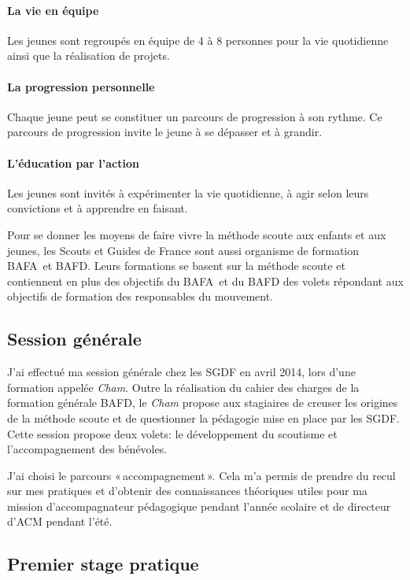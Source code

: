 \documentclass[titlepage,11pt,a4paper]{article}
\begin{document}
\paragraph{La vie en équipe} Les jeunes sont regroupés en équipe de 4 à 8 personnes pour
la vie quotidienne ainsi que la réalisation de projets.

\paragraph{La progression personnelle} Chaque jeune peut se constituer un parcours
de progression à son rythme. Ce parcours de progression invite le jeune à se dépasser et à
grandir.

\paragraph{L'éducation par l'action} Les jeunes sont invités à expérimenter la vie
quotidienne, à agir selon leurs convictions et à apprendre en faisant.

Pour se donner les moyens de faire vivre la méthode scoute aux enfants et aux jeunes, les
Scouts et Guides de France sont aussi organisme de formation BAFA et BAFD\@. Leurs
formations se basent sur la méthode scoute et contiennent en plus des objectifs du BAFA et
du BAFD des volets répondant aux objectifs de formation des responsables du mouvement.

\subsection{Session générale}

J'ai effectué ma session générale chez les SGDF en avril 2014, lors d'une formation
appelée \emph{Cham}. Outre la réalisation du cahier des charges de la formation générale BAFD,
le \emph{Cham} propose aux stagiaires de creuser les origines de la méthode scoute et de
questionner la pédagogie mise en place par les SGDF\@. Cette session propose deux volets: le
développement du scoutisme et l'accompagnement des bénévoles.

J'ai choisi le parcours «\,accompagnement\,». Cela m'a permis de prendre du recul sur mes
pratiques et d'obtenir des connaissances théoriques utiles pour ma mission
d’accompagnateur pédagogique pendant l'année scolaire et de directeur d’ACM pendant l'été.

\subsection{Premier stage pratique}
\end{document}
